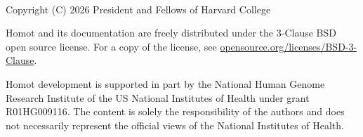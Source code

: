 \newpage
\begin{fullwidth}
  ~\vfill
  \thispagestyle{empty}
  \setlength{\parindent}{0pt}
  \setlength{\parskip}{\baselineskip}

\par
Copyright (C) 2026 President and Fellows of Harvard College

\par
Homot and its documentation are freely distributed
under the 3-Clause BSD open source license. For a copy of the license,
see \href{https://opensource.org/licenses/BSD-3-Clause}{opensource.org/licenses/BSD-3-Clause}.

\par
Homot development is supported in part by the National Human
Genome Research Institute of the US National Institutes of Health under
grant R01HG009116. The content is solely the responsibility
of the authors and does not necessarily represent the official views of
the National Institutes of Health.

\end{fullwidth}




